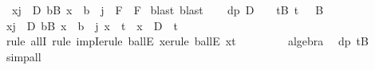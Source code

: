 \begin{isabellebody}
\ \ {\isachardoublequoteopen}{\isasymforall}x{\isachardot}{\kern0pt}{\isacharparenleft}{\kern0pt}{\isasymforall}j{\isasymin}{\isacharbraceleft}{\kern0pt}{}\ {\isachardot}{\kern0pt}{\isachardot}{\kern0pt}\ D{\isacharbraceright}{\kern0pt}{\isachardot}{\kern0pt}\ {\isasymforall}b{\isasymin}B{\isachardot}{\kern0pt}\ x\ {\isasymnoteq}\ b\ {\isacharplus}{\kern0pt}\ j{\isacharparenright}{\kern0pt}\ {\isasymlongrightarrow}\ F\ {\isasymlongrightarrow}\ F{\isachardoublequoteclose}\isanewline
%
\isadelimproof
%
\endisadelimproof
%
\isatagproof
{}\isamarkupfalse%
\ {\isacharparenleft}{\kern0pt}blast{\isacharcomma}{\kern0pt}\ blast{\isacharparenright}{\kern0pt}\isanewline
\ \ \isamarkupfalse%
\ dp{\isacharcolon}{\kern0pt}\ {\isachardoublequoteopen}D\ {\isachargreater}{\kern0pt}\ {}{\isachardoublequoteclose}\ \ tB{\isacharcolon}{\kern0pt}\ {\isachardoublequoteopen}t\ {\isacharminus}{\kern0pt}\ {}{\isasymin}\ B{\isachardoublequoteclose}\isanewline
\ \ \isamarkupfalse%
\ {\isachardoublequoteopen}{\isacharparenleft}{\kern0pt}{\isasymforall}x{\isachardot}{\kern0pt}{\isacharparenleft}{\kern0pt}{\isasymforall}j{\isasymin}{\isacharbraceleft}{\kern0pt}{}\ {\isachardot}{\kern0pt}{\isachardot}{\kern0pt}\ D{\isacharbraceright}{\kern0pt}{\isachardot}{\kern0pt}\ {\isasymforall}b{\isasymin}B{\isachardot}{\kern0pt}\ x\ {\isasymnoteq}\ b\ {\isacharplus}{\kern0pt}\ j{\isacharparenright}{\kern0pt}{\isasymlongrightarrow}\ {\isacharparenleft}{\kern0pt}x\ {\isacharequal}{\kern0pt}\ t{\isacharparenright}{\kern0pt}\ {\isasymlongrightarrow}\ {\isacharparenleft}{\kern0pt}x\ {\isacharminus}{\kern0pt}\ D\ {\isacharequal}{\kern0pt}\ t{\isacharparenright}{\kern0pt}{\isacharparenright}{\kern0pt}{\isachardoublequoteclose}\ \isanewline
\ \ \ \ \isamarkupfalse%
\ {\isacharparenleft}{\kern0pt}rule\ allI{\isacharcomma}{\kern0pt}\ rule\ impI{\isacharcomma}{\kern0pt}erule\ ballE{\isacharbrackleft}{\kern0pt}\ x{\isacharequal}{\kern0pt}{\isachardoublequoteopen}{}{\isachardoublequoteclose}{\isacharbrackright}{\kern0pt}{\isacharcomma}{\kern0pt}erule\ ballE{\isacharbrackleft}{\kern0pt}\ x{\isacharequal}{\kern0pt}{\isachardoublequoteopen}t\ {\isacharminus}{\kern0pt}\ {}{\isachardoublequoteclose}{\isacharbrackright}{\kern0pt}{\isacharparenright}{\kern0pt}\ \isanewline
\ \ \ \ \isamarkupfalse%
\ algebra\ \isamarkupfalse%
\ dp\ tB\ \isamarkupfalse%
\ simp{\isacharunderscore}{\kern0pt}all\isanewline

\end{isabellebody}
